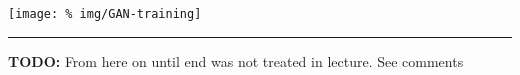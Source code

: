 \documentclass[a2paper,8pt]{extarticle}
\newcommand{\cN}{\mathcal{N}}
\newcommand{\cR}{\mathcal{R}}
\newcommand{\Exp}[2][]{{\mathbb{E}_{#1}}\left[ #2
\right]}
\newcommand{\mat}[1]{\mathbf{#1}}
\renewcommand{\vec}[1]{\mathbf{#1}}
\newcommand{\vz}{\vec{z}}
\newcommand{\vmu}{\boldsymbol{\mu}}
\newcommand{\MSigma}{\mat{\Sigma}}
\newcommand{\todo}[1]{\textbf{TODO:} #1}
\newcommand{\todo}[1]{%
}
\newcommand{\sep}{\vspace{0pt}\noindent\hrule\vspace{0pt}}
\newcommand{\sep}{\vspace{5pt}\noindent\hrule\vspace{5pt}}
\begin{document}
\begin{landscape}
\begin{multicols*}{7}
\begin{center}
  \texttt{[image: \%
img/GAN-training]}
\end{center}

\sep

\todo{From here on until end was not treated in lecture. See comments}

\end{multicols*}
\end{landscape}
\end{document}

